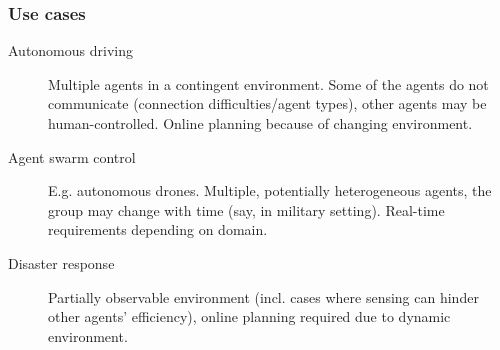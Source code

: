 \documentclass[fleqn,10pt]{olplainarticle}
\begin{document}
\subsubsection{Use cases}
\begin{description}
\item[Autonomous driving] Multiple agents in a contingent environment. Some of the agents do not communicate (connection difficulties/agent types), other agents may be human-controlled. Online planning because of changing environment.
\item[Agent swarm control] E.g. autonomous drones. Multiple, potentially heterogeneous agents, the group may change with time (say, in military setting). Real-time requirements depending on domain.
\item [Disaster response] Partially observable environment (incl. cases where sensing can hinder other agents' efficiency), online planning required due to dynamic environment.
\end{description}
\end{document}
